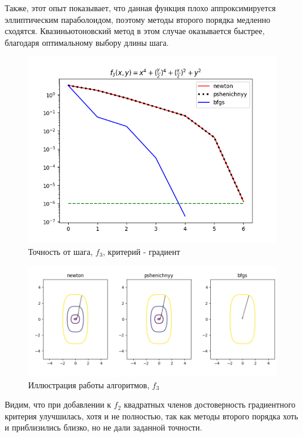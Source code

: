Также, этот опыт показывает, что данная функция плохо аппроксимируется эллиптическим параболоидом, поэтому методы второго порядка медленно сходятся.
Квазиньютоновский метод в этом случае оказывается быстрее, благодаря оптимальному выбору длины шага.

\begin{figure}[H]
			\centering
			\includegraphics[scale=0.75]{figures/acc_from_step_func3}
			\caption{Точность от шага, $f_3$, критерий - градиент}
			\label{fig:acc_from_step_func3}
\end{figure}

\begin{figure}[H]
			\centering
			\includegraphics[scale=0.75]{figures/process_view_func3}
			\caption{Иллюстрация работы алгоритмов, $f_3$}
			\label{fig:process_view_func3}
\end{figure}

Видим, что при добавлении к $f_2$ квадратных членов достоверность градиентного критерия улучшилась, хотя и не полностью, так как методы второго порядка хоть и приблизились близко, но не дали заданной точности.

